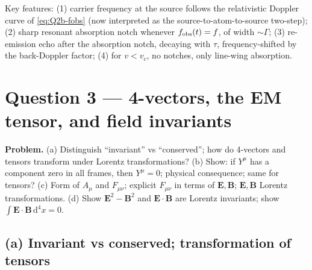 \documentclass[11pt]{article}
\newcommand{\de}{\mathrm{d}}
\begin{document}
\begin{center}
\end{center}

Key features: (1) carrier frequency at the source follows the relativistic Doppler curve of \eqref{eq:Q2b-fobs} (now interpreted as the source-to-atom-to-source two-step); (2) sharp resonant absorption notch whenever $f_{\rm obs}(t)=f$, of width $\sim\Gamma$; (3) re-emission echo after the absorption notch, decaying with $\tau$, frequency-shifted by the back-Doppler factor; (4) for $v<v_c$, no notches, only line-wing absorption.

\section*{Question 3 --- 4-vectors, the EM tensor, and field invariants}

\textbf{Problem.} (a) Distinguish ``invariant'' vs ``conserved''; how do 4-vectors and tensors transform under Lorentz transformations? (b) Show: if $Y^\mu$ has a component zero in all frames, then $Y^\mu=0$; physical consequence; same for tensors? (c) Form of $A_\mu$ and $F_{\mu\nu}$; explicit $F_{\mu\nu}$ in terms of $\bm E,\bm B$; $\bm E,\bm B$ Lorentz transformations. (d) Show $\bm E^2-\bm B^2$ and $\bm E\cdot\bm B$ are Lorentz invariants; show $\int\bm E\cdot\bm B\,\de^4 x=0$.

\subsection*{(a) Invariant vs conserved; transformation of tensors}
\end{document}
